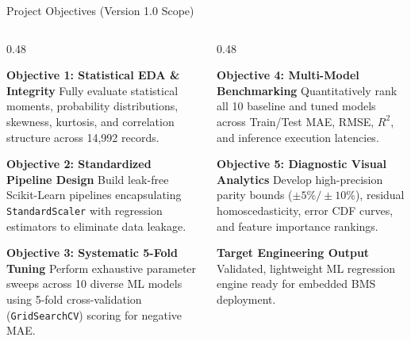 \documentclass[aspectratio=169, 10pt]{beamer}
\begin{document}
\begin{frame}{Project Objectives (Version 1.0 Scope)}
\begin{columns}[T]
  \begin{column}{0.48\textwidth}
    \begin{block}{\textbf{Objective 1: Statistical EDA \& Integrity}}
      \footnotesize Fully evaluate statistical moments, probability distributions, skewness, kurtosis, and correlation structure across 14,992 records.
    \end{block}
    \vspace{0.3em}
    \begin{block}{\textbf{Objective 2: Standardized Pipeline Design}}
      \footnotesize Build leak-free Scikit-Learn pipelines encapsulating \texttt{StandardScaler} with regression estimators to eliminate data leakage.
    \end{block}
    \vspace{0.3em}
    \begin{block}{\textbf{Objective 3: Systematic 5-Fold Tuning}}
      \footnotesize Perform exhaustive parameter sweeps across 10 diverse ML models using 5-fold cross-validation (\texttt{GridSearchCV}) scoring for negative MAE.
    \end{block}
  \end{column}

  \begin{column}{0.48\textwidth}
    \begin{block}{\textbf{Objective 4: Multi-Model Benchmarking}}
      \footnotesize Quantitatively rank all 10 baseline and tuned models across Train/Test MAE, RMSE, $R^2$, and inference execution latencies.
    \end{block}
    \vspace{0.3em}
    \begin{block}{\textbf{Objective 5: Diagnostic Visual Analytics}}
      \footnotesize Develop high-precision parity bounds ($\pm 5\% / \pm 10\%$), residual homoscedasticity, error CDF curves, and feature importance rankings.
    \end{block}
    \vspace{0.3em}
    \begin{exampleblock}{\textbf{Target Engineering Output}}
      \scriptsize Validated, lightweight ML regression engine ready for embedded BMS deployment.
    \end{exampleblock}
  \end{column}
\end{columns}
\end{frame}
\end{document}
